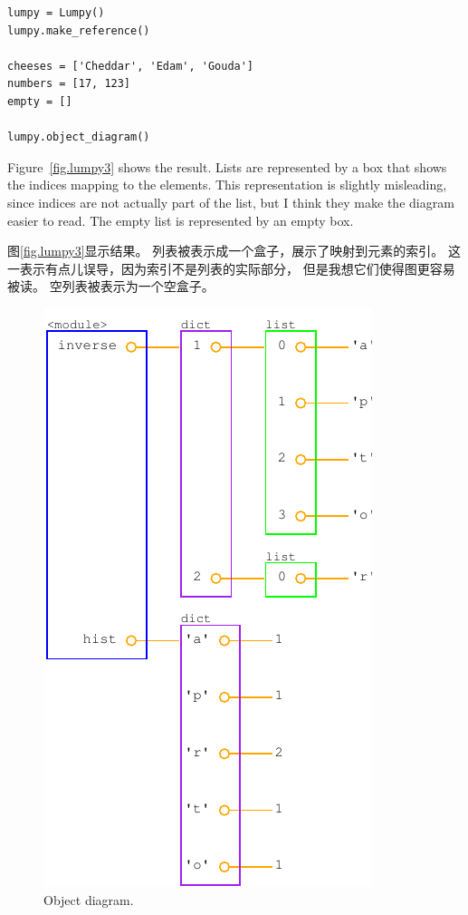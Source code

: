 \documentclass[10pt]{book}
\begin{document}
\begin{CJK}{UTF8}{gbsn}
\begin{verbatim}
lumpy = Lumpy()
lumpy.make_reference()

cheeses = ['Cheddar', 'Edam', 'Gouda']
numbers = [17, 123]
empty = []

lumpy.object_diagram()
\end{verbatim}

Figure~\ref{fig.lumpy3} shows the result.  Lists are represented by
a box that shows the indices mapping to the elements.  This representation
is slightly misleading, since indices are not actually
part of the list, but I think they make the diagram easier to
read.  The empty list is represented by an empty box. 

图\ref{fig.lumpy3}显示结果。
列表被表示成一个盒子，展示了映射到元素的索引。
这一表示有点儿误导，因为索引不是列表的实际部分，
但是我想它们使得图更容易被读。
空列表被表示为一个空盒子。

\begin{figure}
\centerline
{\includegraphics[scale=0.7]{figs/lumpydemo4.pdf}}
\caption{Object diagram.}
\label{fig.lumpy4}
\end{figure}


\end{CJK}
\end{document}
